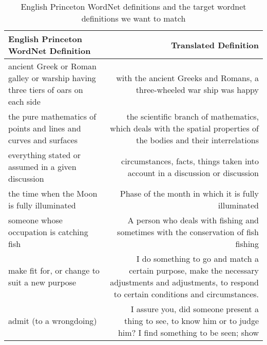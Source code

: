 \begin{table}[htbp]
    \centering
    \begin{tabulary}{\textwidth}{LR}
        \toprule%
        \textbf{English Princeton WordNet Definition} & \textbf{Translated Definition} \\
        \midrule%
        ancient Greek or Roman galley or warship having three tiers of oars on each side & with the ancient Greeks and Romans, a three-wheeled war ship was happy \\
        \cmidrule(rl){1-2}
        the pure mathematics of points and lines and curves and surfaces & the scientific branch of mathematics, which deals with the spatial properties of the bodies and their interrelations \\
        \cmidrule(rl){1-2}
        everything stated or assumed in a given discussion & circumstances, facts, things taken into account in a discussion or discussion \\
        \cmidrule(rl){1-2}
        the time when the Moon is fully illuminated & Phase of the month in which it is fully illuminated \\
        \cmidrule(rl){1-2}
        someone whose occupation is catching fish & A person who deals with fishing and sometimes with the conservation of fish fishing \\
        \cmidrule(rl){1-2}
        make fit for, or change to suit a new purpose & I do something to go and match a certain purpose, make the necessary adjustments and adjustments, to respond to certain conditions and circumstances. \\
        \cmidrule(rl){1-2}
        admit (to a wrongdoing) & I assure you, did someone present a thing to see, to know him or to judge him? I find something to be seen; show \\
        \bottomrule %
    \end{tabulary}%
    \caption{English Princeton WordNet definitions and the target wordnet definitions we want to match}%
    \label{tab:pwn_translated}
\end{table}


